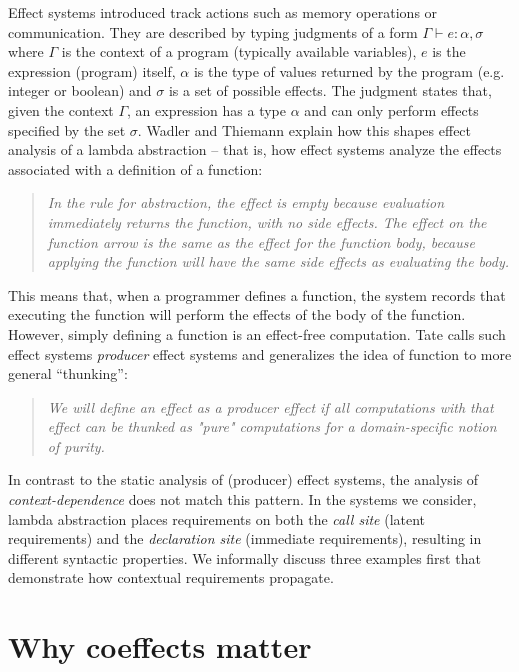Effect systems introduced track actions such as memory operations or communication. They are described 
by typing judgments of a form $\Gamma \vdash e : \alpha, \sigma$ where $\Gamma$ is the context of a 
program (typically available variables), $e$ is the expression (program) itself, $\alpha$ is the type of 
values returned by the program (e.g. integer or boolean) and $\sigma$ is a set of possible effects. The 
judgment states that, given the context $\Gamma$, an expression has a type $\alpha$ and can only perform 
effects specified by the set $\sigma$. Wadler and Thiemann \cite{monads-effects-marriage} explain how 
this shapes effect analysis of a lambda abstraction -- that is, how effect systems analyze the effects 
associated with a definition of a function:
%
\begin{quote} 
\emph{In the rule for abstraction, the effect is empty because evaluation immediately
returns the function, with no side effects. The effect on the function arrow
is the same as the effect for the function body, because applying the function will
have the same side effects as evaluating the body.}
\end{quote}
%
This means that, when a programmer defines a function, the system records that executing the 
function will perform the effects of the body of the function. However, simply defining a function
is an effect-free computation. Tate \cite{effects-producer-semantics} calls such effect systems
\emph{producer} effect systems and generalizes the idea of function to more general ``thunking'':
%
\begin{quote}
\emph{We will define an effect as a producer effect if all computations with that effect 
can be thunked as "pure" computations for a domain-specific notion of purity.}
\end{quote}
%
In contrast to the static analysis of (producer) effect systems, the analysis of 
\emph{context-dependence} does not match this pattern. In the systems we consider, lambda 
abstraction places requirements on both the \emph{call site} (latent requirements) and the 
\emph{declaration site} (immediate requirements), resulting in different syntactic properties. 
We informally discuss three examples first that demonstrate how contextual requirements propagate. 


\section{Why coeffects matter}

